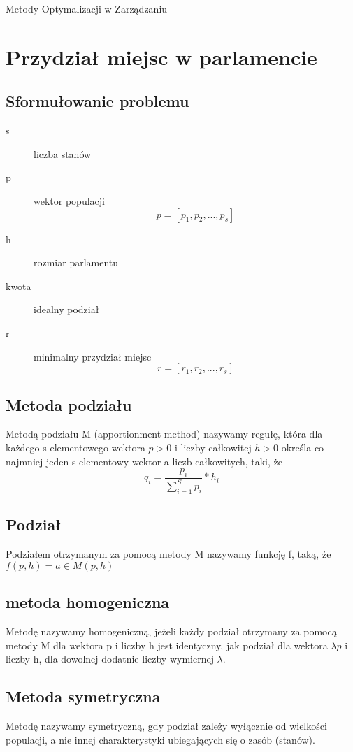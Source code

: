 \documentclass[12pt,a4paper]{article}
\begin{document}
\lstset{language=Pascal}
Metody Optymalizacji w Zarządzaniu
\newpage
\tableofcontents
\section{Przydział miejsc w parlamencie}
\subsection{Sformułowanie problemu}
\begin{description}
\item[s] liczba stanów
\item [p ]wektor populacji
\begin{equation}
p=[p_1, p_2, ... , p_s]
\end{equation}
\item [h] rozmiar parlamentu
\item[kwota] idealny podział
\item[r] minimalny przydział miejsc
\begin{equation}
r=[r_1, r_2, ... , r_s]
\end{equation}
\end{description}
\subsection{Metoda podziału}
Metodą podziału M (apportionment method) nazywamy regułę, która dla każdego s-elementowego wektora $ p>0 $ i liczby całkowitej $h  >0$ określa co najmniej jeden s-elementowy wektor a liczb całkowitych, taki, że 
\begin{equation}
q_i = \frac{p_i}{\sum \limits_{i=1}^{S} p_i} * h_i
\end{equation}
\subsection{Podział}
Podziałem otrzymanym za pomocą metody M
 nazywamy funkcję f, taką, że 
 $f(p, h) =  a \in M(p, h)$
\subsection{metoda homogeniczna}
Metodę nazywamy homogeniczną, jeżeli każdy podział otrzymany za pomocą metody M dla wektora p i liczby h jest identyczny, jak podział dla wektora $\lambda p$ i liczby h, dla
dowolnej dodatnie liczby wymiernej $ \lambda$. 
\subsection{Metoda symetryczna}
Metodę nazywamy symetryczną, gdy podział zależy wyłącznie od wielkości populacji, a nie innej charakterystyki ubiegających się o zasób (stanów).
\end{document}
